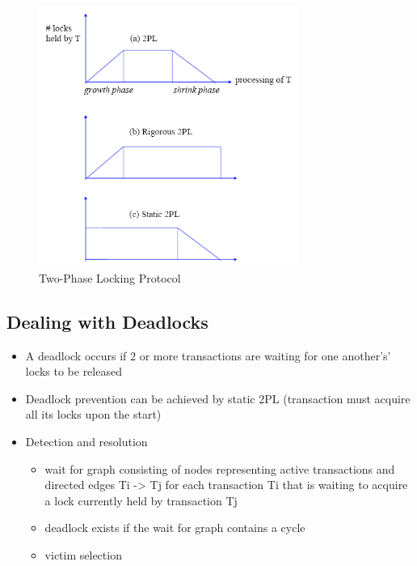 \documentclass{report}
\begin{document}
    \begin{figure}
        \includegraphics[width=240pt]{./images/2PL.png}
        \caption{\label{fig:2PL}Two-Phase Locking Protocol}
    \end{figure}
    \subsection{Dealing with Deadlocks}
    \begin{itemize}
        \item A deadlock occurs if 2 or more transactions are waiting for one another’s’ locks to be released
        \item Deadlock prevention can be achieved by static 2PL (transaction must acquire all its locks upon the start)
        \item Detection and resolution
        \begin{itemize}
            \item wait for graph consisting of nodes representing active transactions and directed edges Ti  -> Tj for each transaction Ti that is waiting to acquire a lock currently held by transaction Tj
            \item deadlock exists if the wait for graph contains a cycle
            \item victim selection
        \end{itemize}
    \end{itemize}
\end{document}
